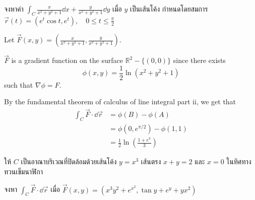 \documentclass[12pt,final]{novelette} %
\begin{document}
\begin{question}
\begin{question}
        \item
        จงหาค่า $\displaystyle \int_C \frac{x}{x^2+y^2+1} \dd{x} + \frac{y}{x^2+y^2+1} \dd{y}$ เมื่อ $y$ เป็นเส้นโค้ง
        กำหนดโดยสมการ \\[.5em]
        $\displaystyle \vec{r}(t) = (e^t \cos t, e^t), \quad 0 \leq t \leq \frac{\pi}{2}$ 

        \bigskip
        Let $\displaystyle\vec{F}(x, y) = \left(\frac{x}{x^2+y^2+1}, \frac{y}{x^2+y^2+1}\right)$.

        \medskip
        $\vec{F}$ is a gradient function on the surface $\mathbb{R}^2 - \{(0,0)\}$
        since there exists
        $$\phi(x, y) = \frac12 \ln\left(x^2+y^2+1\right)$$
        such that $\nabla\phi = F$.

        \medskip
        By the fundamental theorem of calculus of line integral part ii, we get that
        \begin{align*}
            \int_C \vec{F} \cdot \dd{\vec{r}} & = \phi(B) - \phi(A)                                 \\
                                              & = \phi(0, e^{\pi/2}) - \phi(1, 1)                   \\
                                              & = \boxed{\frac12 \ln\left(\frac{1+e^\pi}{3}\right)}
        \end{align*}
    \end{question}

    \item {}
    ให้ $C$ เป็นอาณาบริเวณที่ปิดล้อมด้วยเส้นโค้ง $y = x^3$ เส้นตรง $x + y = 2$ และ $x = 0$ ในทิศทางทวนเข็มนาฬิกา

    จงหา $\int_C \vec{F} \cdot \dd{\vec{r}}$ เมื่อ $\vec{F}(x, y) = (x^3y^2 + e^{x^2}, \tan y + e^y + yx^2)$ 


\end{question}
\end{document}
